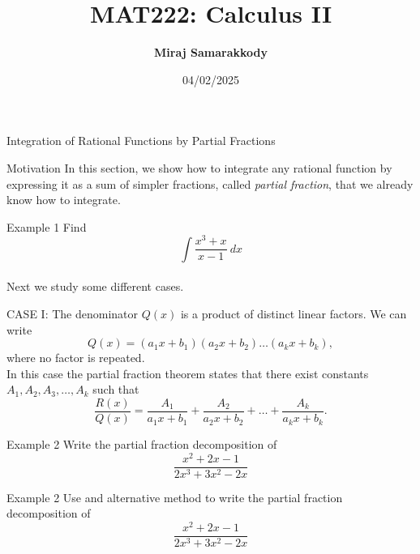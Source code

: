 \documentclass{beamer}
\title{MAT222: Calculus II}
\author{\textbf{Miraj Samarakkody}}
\institute{Tougaloo College}
\date{04/02/2025}
\begin{document}
\begin{frame}
    \titlepage
\end{frame}





\begin{frame}{}
\begin{center}
    \Huge{Integration of Rational Functions by Partial Fractions}
\end{center}
\end{frame}

\begin{frame}{Motivation}
In this section, we show how to integrate any rational function by expressing it as a sum of simpler fractions, called \textit{partial fraction}, that we already know how to integrate. 
\end{frame}

    \begin{frame}{Example 1}
    Find \[\int \dfrac{x^3+x}{x-1}~dx\]\\ \pause
    \vspace{0.5in}
    Next we study some different cases. 
    \end{frame}

\begin{frame}{CASE I: The denominator \(Q(x)\) is a product of distinct linear factors.}    
We can write \[Q(x)=(a_1 x+b_1)(a_2x+b_2)\dots (a_k x +b_k),\] where no factor is repeated. \\ \pause
\vspace{0.2in}
In this case the partial fraction theorem states that there exist constants \(A_1,A_2,A_3, \dots , A_k\) such that \[\dfrac{R(x)}{Q(x)}= \dfrac{A_1}{a_1x+b_1}+ \dfrac{A_2}{a_2x+b_2}+ \dots + \dfrac{A_k}{a_k x +b_k}.\]
\end{frame}

\begin{frame}{Example 2}
Write the partial fraction decomposition of \[\dfrac{x^2 +2x -1}{2x^3+3x^2-2x}\]
\end{frame}

\begin{frame}{Example 2}
    Use and alternative method to write the partial fraction decomposition of \[\dfrac{x^2 +2x -1}{2x^3+3x^2-2x}\]
\end{frame}
\end{document}
